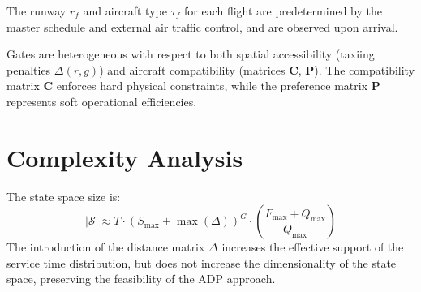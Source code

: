 \begin{assumption}
	The runway $r_f$ and aircraft type $\tau_f$ for each flight are predetermined 
	by the master schedule and external air traffic control, and are observed 
	upon arrival.
\end{assumption}

\begin{assumption}
	Gates are heterogeneous with respect to both spatial accessibility (taxiing 
	penalties $\Delta(r, g)$) and aircraft compatibility (matrices $\mathbf{C}$, 
	$\mathbf{P}$). The compatibility matrix $\mathbf{C}$ enforces hard physical 
	constraints, while the preference matrix $\mathbf{P}$ represents soft 
	operational efficiencies.
\end{assumption}

\section{Complexity Analysis}

The state space size is:
%
\begin{equation}
	|\mathcal{S}| \approx T \cdot (S_{\max} + \max(\Delta))^G \cdot \binom{F_{\max} + Q_{\max}}{Q_{\max}}
\end{equation}
%
The introduction of the distance matrix $\Delta$ increases the effective support of the service time distribution, but does not increase the dimensionality of the state space, preserving the feasibility of the ADP approach.